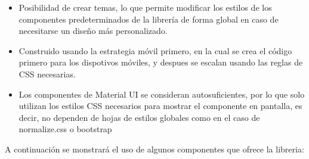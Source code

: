\begin{itemize}
    \item Posibilidad de crear temas, lo que permite modificar los estilos de los componentes predeterminados de la librería de forma global en caso de necesitarse un diseño más personalizado.
    \item Construido usando la estrategia móvil primero, en la cual se crea el código primero para los dispotivos móviles, y despues se escalan usando las reglas de CSS necesarias.
    \item Los componentes de Material UI se consideran autosuficientes, por lo que solo utilizan los estilos CSS necesarios para mostrar el componente en pantalla, es decir, no dependen de hojas de estilos globales como en el caso de normalize.css o bootstrap
\end{itemize}

A continuación se monstrará el uso de algunos componentes que ofrece la libreria:

